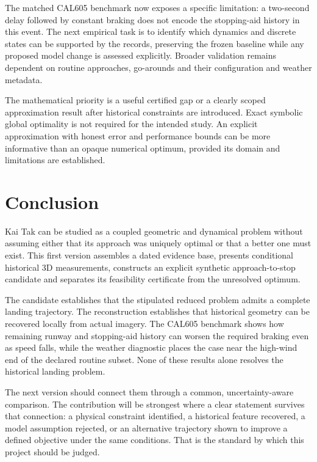 The matched CAL605 benchmark now exposes a specific limitation: a two-second delay followed by constant braking does not encode the stopping-aid history in this event. The next empirical task is to identify which dynamics and discrete states can be supported by the records, preserving the frozen baseline while any proposed model change is assessed explicitly. Broader validation remains dependent on routine approaches, go-arounds and their configuration and weather metadata.

The mathematical priority is a useful certified gap or a clearly scoped approximation result after historical constraints are introduced. Exact symbolic global optimality is not required for the intended study. An explicit approximation with honest error and performance bounds can be more informative than an opaque numerical optimum, provided its domain and limitations are established.

\section{Conclusion}
Kai Tak can be studied as a coupled geometric and dynamical problem without assuming either that its approach was uniquely optimal or that a better one must exist. This first version assembles a dated evidence base, presents conditional historical 3D measurements, constructs an explicit synthetic approach-to-stop candidate and separates its feasibility certificate from the unresolved optimum.

The candidate establishes that the stipulated reduced problem admits a complete landing trajectory. The reconstruction establishes that historical geometry can be recovered locally from actual imagery. The CAL605 benchmark shows how remaining runway and stopping-aid history can worsen the required braking even as speed falls, while the weather diagnostic places the case near the high-wind end of the declared routine subset. None of these results alone resolves the historical landing problem.

The next version should connect them through a common, uncertainty-aware comparison. The contribution will be strongest where a clear statement survives that connection: a physical constraint identified, a historical feature recovered, a model assumption rejected, or an alternative trajectory shown to improve a defined objective under the same conditions. That is the standard by which this project should be judged.
